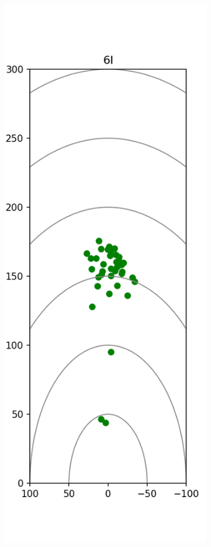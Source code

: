 \documentclass{kththesis}
\begin{document}
\begin{figure}
    \centering
    \begin{subfigure}{0.4\textwidth}
    \centering
    \includegraphics[height=0.4\textheight]{Shots/6I_shots.png} 

\end{subfigure}
\end{figure}
\end{document}
